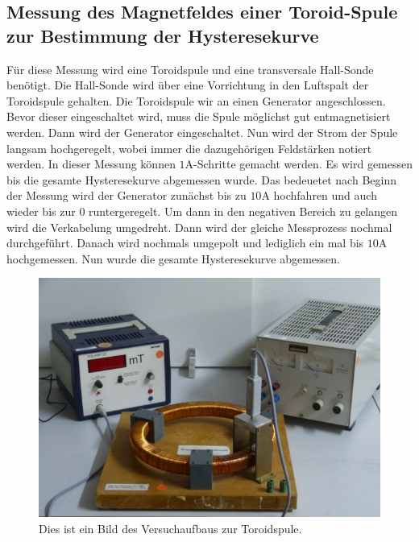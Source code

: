 \subsection{Messung des Magnetfeldes einer Toroid-Spule zur Bestimmung der Hysteresekurve}
\label{subsec:D_Hysterese}
Für diese Messung wird eine Toroidspule und eine transversale Hall-Sonde benötigt. Die Hall-Sonde wird über eine Vorrichtung in den Luftspalt der Toroidspule gehalten. Die Toroidspule
wir an einen Generator angeschlossen. Bevor dieser eingeschaltet wird, muss die Spule möglichst gut entmagnetisiert werden. Dann wird der Generator eingeschaltet. Nun wird der Strom
der Spule langsam hochgeregelt, wobei immer die dazugehörigen Feldstärken notiert werden. In dieser Messung können $1\unit{\ampere}$-Schritte gemacht werden. Es wird gemessen bis die 
gesamte Hysteresekurve abgemessen wurde. Das bedeuetet nach Beginn der Messung wird der Generator zunächst bis zu $10\unit{\ampere}$ hochfahren und auch wieder bis zur $0$ runtergeregelt.
Um dann in den negativen Bereich zu gelangen wird die Verkabelung umgedreht. Dann wird der gleiche Messprozess nochmal durchgeführt. Danach wird nochmals umgepolt und lediglich ein mal 
bis $10\unit{\ampere}$ hochgemessen. Nun wurde die gesamte Hysteresekurve abgemessen.
\begin{figure}
    \centering
    \caption{Dies ist ein Bild des Versuchaufbaus zur Toroidspule.\cite{v308}}
    \label{fig:Aufbau_Toroid}
    \includegraphics[width=\textwidth]{content/RingSpuleAufbau.PNG}
\end{figure}